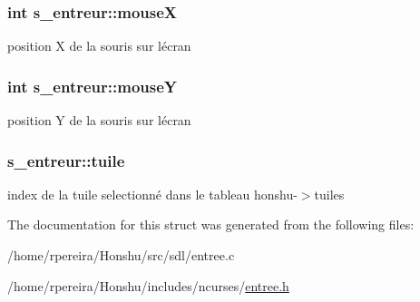 \subsubsection[{\texorpdfstring{mouseX}{mouseX}}]{\setlength{\rightskip}{0pt plus 5cm}int s\+\_\+entreur\+::mouseX}\hypertarget{structs__entreur_a03edb5e23791633fc3082592490f2d8c}{}\label{structs__entreur_a03edb5e23791633fc3082592490f2d8c}
position X de la souris sur l\textquotesingle{}écran 
\subsubsection[{\texorpdfstring{mouseY}{mouseY}}]{\setlength{\rightskip}{0pt plus 5cm}int s\+\_\+entreur\+::mouseY}\hypertarget{structs__entreur_a883d34d553aff845ab05711cfb1fafb5}{}\label{structs__entreur_a883d34d553aff845ab05711cfb1fafb5}
position Y de la souris sur l\textquotesingle{}écran 
\subsubsection[{\texorpdfstring{tuile}{tuile}}]{ s\+\_\+entreur\+::tuile}\hypertarget{structs__entreur_a07f9cadcea8249c14f0d0f38283e9b63}{}\label{structs__entreur_a07f9cadcea8249c14f0d0f38283e9b63}
index de la tuile selectionné dans le tableau \textquotesingle{}honshu-\/$>$tuiles\textquotesingle{} 

The documentation for this struct was generated from the following files\+:\begin{DoxyCompactItemize}
\item 
/home/rpereira/\+Honshu/src/sdl/entree.\+c\item 
/home/rpereira/\+Honshu/includes/ncurses/\hyperlink{ncurses_2entree_8h}{entree.\+h}\end{DoxyCompactItemize}
